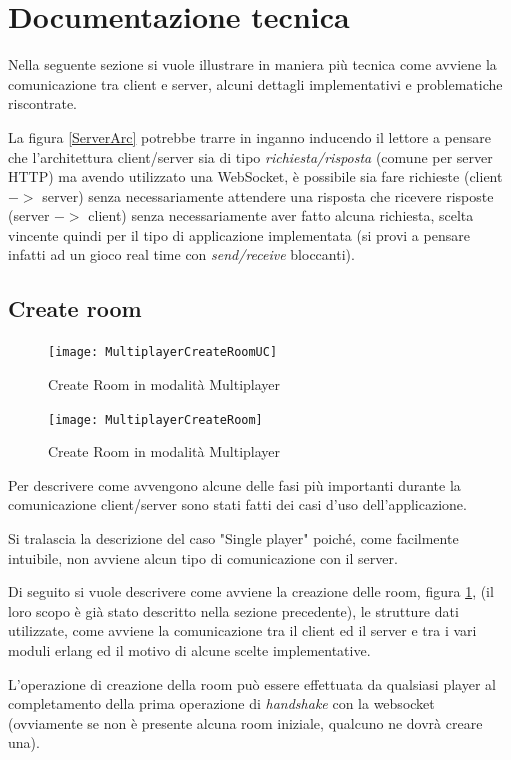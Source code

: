 \documentclass[paper=a4, fontsize=11pt]{scrartcl} %
\numberwithin{equation}{section} %
\numberwithin{figure}{section} %
\numberwithin{table}{section} %
\begin{document}
\section{Documentazione tecnica}
Nella seguente sezione si vuole illustrare in maniera più tecnica come avviene la comunicazione tra client e server, alcuni dettagli implementativi e problematiche riscontrate.

La figura \ref{ServerArc} potrebbe trarre in inganno inducendo il lettore a pensare che l'architettura client/server sia di tipo \textit{richiesta/risposta} (comune per server HTTP) ma avendo utilizzato una WebSocket, è possibile sia fare richieste (client $->$ server) senza necessariamente attendere una risposta che ricevere risposte (server $->$ client) senza necessariamente aver fatto alcuna richiesta, scelta vincente quindi per il tipo di applicazione implementata (si provi a pensare infatti ad un gioco real time con \textit{send/receive} bloccanti).

\subsection{Create room}

\begin{figure}
\centering
\texttt{[image: MultiplayerCreateRoomUC]}
\caption{Create Room in modalità Multiplayer}
\label{CreateRoomUC}
\end{figure}

\begin{figure}
\centering
\texttt{[image: MultiplayerCreateRoom]}
\caption{Create Room in modalità Multiplayer}
\label{CreateRoom}
\end{figure}


Per descrivere come avvengono alcune delle fasi più importanti durante la comunicazione client/server sono stati fatti dei casi d'uso dell'applicazione.

Si tralascia la descrizione del caso "Single player" poiché, come facilmente intuibile, non avviene alcun tipo di comunicazione con il server.

Di seguito si vuole descrivere come avviene la creazione delle room, figura \ref{CreateRoomUC}, (il loro scopo è già stato descritto nella sezione precedente), le strutture dati utilizzate, come avviene la comunicazione tra il client ed il server e tra i vari moduli erlang ed il motivo di alcune scelte implementative.

L'operazione di creazione della room può essere effettuata da qualsiasi player al completamento della prima operazione di \textit{handshake} con la websocket (ovviamente se non è presente alcuna room iniziale, qualcuno ne dovrà creare una).
\end{document}
